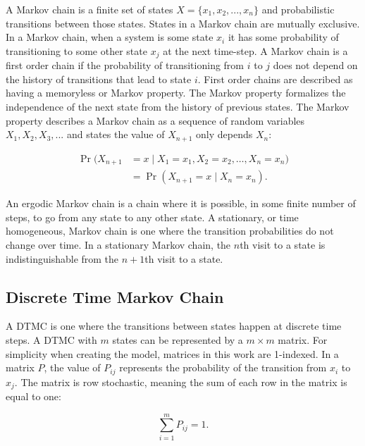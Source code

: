 %
A Markov chain is a finite set of states $X=\{x_1, x_2, ..., x_n\}$ and probabilistic transitions between those states.
States in a Markov chain are mutually exclusive.
In a Markov chain, when a system is some state $x_i$ it has some probability of transitioning to some other state $x_j$ at the next time-step.
A Markov chain is a first order chain if the probability of transitioning from $i$ to $j$ does not depend on the history of transitions that lead to state $i$.
First order chains are described as having a memoryless or Markov property.
The Markov property formalizes the independence of the next state from the history of previous states.
The Markov property describes a Markov chain as a sequence of random variables $X_{1}, X_{2}, X_{3}, ...$ and states the value of $X_{n+1}$ only depends $X_{n}$: \cite{MARKOV3}

\begin{align} \Pr(X_{n+1}&=x\mid X_1=x_1, X_2=x_2, \ldots, X_n=x_n)
\nonumber \\ &= \Pr(X_{n+1}=x\mid X_n=x_n). \end{align}

An ergodic Markov chain is a chain where it is possible, in some finite number of steps, to go from any state to any other state.
A stationary, or time homogeneous, Markov chain is one where the transition probabilities do not change over time.
In a stationary Markov chain, the $n$th visit to a state is indistinguishable from the $n+1$th visit to a state.

\subsection{Discrete Time Markov Chain}

A \ac{DTMC} is one where the transitions between states happen at discrete time steps.
A \ac{DTMC} with $m$ states can be represented by a $m\times m$ matrix.
For simplicity when creating the model, matrices in this work are 1-indexed.
In a matrix $P$, the value of $P_{ij}$ represents the probability of the transition from $x_i$ to $x_j$.
The matrix is row stochastic, meaning the sum of each row in the matrix is equal to one:

\begin{equation} \sum_{i=1}^{m} P_{ij} = 1. \end{equation}

